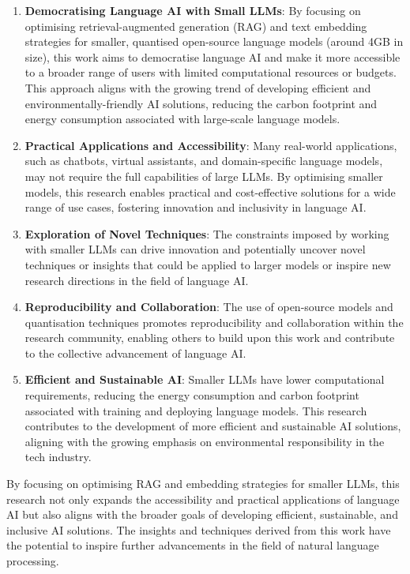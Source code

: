 \documentclass[
  letterpaper,
  DIV=11,
  numbers=noendperiod]{scrartcl}
\begin{document}
\begin{enumerate}
\def\labelenumi{\arabic{enumi}.}
\item
  \textbf{Democratising Language AI with Small LLMs}: By focusing on
  optimising retrieval-augmented generation (RAG) and text embedding
  strategies for smaller, quantised open-source language models (around
  4GB in size), this work aims to democratise language AI and make it
  more accessible to a broader range of users with limited computational
  resources or budgets. This approach aligns with the growing trend of
  developing efficient and environmentally-friendly AI solutions,
  reducing the carbon footprint and energy consumption associated with
  large-scale language models.
\item
  \textbf{Practical Applications and Accessibility}: Many real-world
  applications, such as chatbots, virtual assistants, and
  domain-specific language models, may not require the full capabilities
  of large LLMs. By optimising smaller models, this research enables
  practical and cost-effective solutions for a wide range of use cases,
  fostering innovation and inclusivity in language AI.
\item
  \textbf{Exploration of Novel Techniques}: The constraints imposed by
  working with smaller LLMs can drive innovation and potentially uncover
  novel techniques or insights that could be applied to larger models or
  inspire new research directions in the field of language AI.
\item
  \textbf{Reproducibility and Collaboration}: The use of open-source
  models and quantisation techniques promotes reproducibility and
  collaboration within the research community, enabling others to build
  upon this work and contribute to the collective advancement of
  language AI.
\item
  \textbf{Efficient and Sustainable AI}: Smaller LLMs have lower
  computational requirements, reducing the energy consumption and carbon
  footprint associated with training and deploying language models. This
  research contributes to the development of more efficient and
  sustainable AI solutions, aligning with the growing emphasis on
  environmental responsibility in the tech industry.
\end{enumerate}

By focusing on optimising RAG and embedding strategies for smaller LLMs,
this research not only expands the accessibility and practical
applications of language AI but also aligns with the broader goals of
developing efficient, sustainable, and inclusive AI solutions. The
insights and techniques derived from this work have the potential to
inspire further advancements in the field of natural language
processing.
\end{document}
